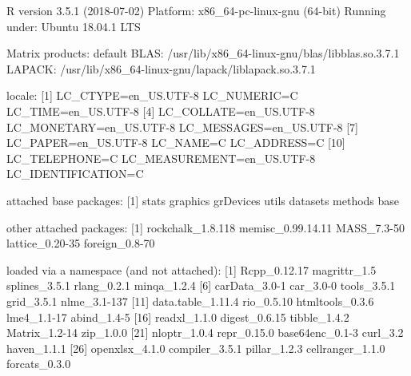 \begin{Schunk}
\begin{Soutput}
R version 3.5.1 (2018-07-02)
Platform: x86_64-pc-linux-gnu (64-bit)
Running under: Ubuntu 18.04.1 LTS

Matrix products: default
BLAS: /usr/lib/x86_64-linux-gnu/blas/libblas.so.3.7.1
LAPACK: /usr/lib/x86_64-linux-gnu/lapack/liblapack.so.3.7.1

locale:
 [1] LC_CTYPE=en_US.UTF-8       LC_NUMERIC=C               LC_TIME=en_US.UTF-8       
 [4] LC_COLLATE=en_US.UTF-8     LC_MONETARY=en_US.UTF-8    LC_MESSAGES=en_US.UTF-8   
 [7] LC_PAPER=en_US.UTF-8       LC_NAME=C                  LC_ADDRESS=C              
[10] LC_TELEPHONE=C             LC_MEASUREMENT=en_US.UTF-8 LC_IDENTIFICATION=C       

attached base packages:
[1] stats     graphics  grDevices utils     datasets  methods   base     

other attached packages:
[1] rockchalk_1.8.118 memisc_0.99.14.11 MASS_7.3-50       lattice_0.20-35   foreign_0.8-70   

loaded via a namespace (and not attached):
 [1] Rcpp_0.12.17      magrittr_1.5      splines_3.5.1     rlang_0.2.1       minqa_1.2.4      
 [6] carData_3.0-1     car_3.0-0         tools_3.5.1       grid_3.5.1        nlme_3.1-137     
[11] data.table_1.11.4 rio_0.5.10        htmltools_0.3.6   lme4_1.1-17       abind_1.4-5      
[16] readxl_1.1.0      digest_0.6.15     tibble_1.4.2      Matrix_1.2-14     zip_1.0.0        
[21] nloptr_1.0.4      repr_0.15.0       base64enc_0.1-3   curl_3.2          haven_1.1.1      
[26] openxlsx_4.1.0    compiler_3.5.1    pillar_1.2.3      cellranger_1.1.0  forcats_0.3.0    
\end{Soutput}
\end{Schunk}
